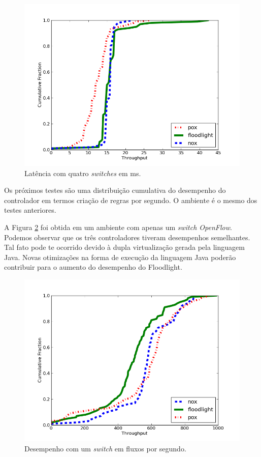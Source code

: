 \begin{figure}[h]
\centering
\includegraphics[width=140mm]{latencia_4sw.png}
\caption{Latência com quatro \textit{switches} em ms.}
\label{fig:latencia4sw} 
\end{figure}

Os próximos testes são uma distribuição cumulativa do
desempenho do controlador em termos criação de regras por
segundo. O ambiente é o mesmo dos testes anteriores.

A Figura \ref{fig:desempenho1sw} foi obtida em um ambiente
com apenas um \textit{switch OpenFlow}. Podemos observar 
que os três controladores tiveram desempenhos semelhantes.
Tal fato pode te ocorrido devido à dupla virtualização gerada
pela linguagem Java. Novas otimizações na forma de execução
da linguagem Java poderão contribuir para o aumento do 
desempenho do Floodlight.

\begin{figure}[h]
\centering
\includegraphics[width=140mm]{desempenho_1sw.png}
\caption{Desempenho com um \textit{switch} em fluxos por segundo.}
\label{fig:desempenho1sw} 
\end{figure}

